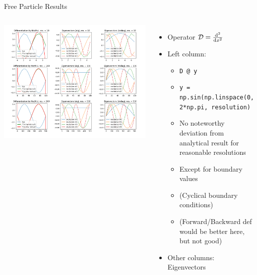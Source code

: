 \begin{frame}{Free Particle Results}
%
\begin{columns}[T]
\includegraphics[width=\linewidth]{./gfx/07-free-particle-resolutions}
%
\begin{itemize}
\item Operator $\mathcal{D} = \dv[2]{x}$
\item Left column: 
	\begin{itemize}
	\item \texttt{D @ y} 
	\item \texttt{y = np.sin(np.linspace(0, 2*np.pi, resolution)}
	\item No noteworthy deviation from analytical result for reasonable resolutions
	\item Except for boundary values
	\item (Cyclical boundary conditions)
	\item (Forward/Backward def would be better here, but not good)
	\end{itemize}
\item Other columns: Eigenvectors
\end{itemize}
\end{columns}
%
\end{frame}


